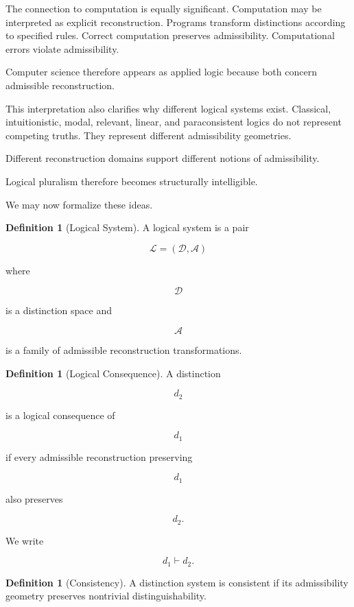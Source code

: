 \documentclass[12pt,oneside]{article}
\theoremstyle{definition}
\newtheorem{definition}[theorem]{Definition} \newtheorem{axiom}[theorem]{Axiom} \newtheorem{remark}[theorem]{Remark} \newtheorem{example}[theorem]{Example}
\begin{document}
The connection to computation is equally significant. Computation may be interpreted as explicit reconstruction. Programs transform distinctions according to specified rules. Correct computation preserves admissibility. Computational errors violate admissibility.

Computer science therefore appears as applied logic because both concern admissible reconstruction.

This interpretation also clarifies why different logical systems exist. Classical, intuitionistic, modal, relevant, linear, and paraconsistent logics do not represent competing truths. They represent different admissibility geometries.

Different reconstruction domains support different notions of admissibility.

Logical pluralism therefore becomes structurally intelligible.

We may now formalize these ideas.

\begin{definition}[Logical System]

A logical system is a pair

\[
\mathcal L
=
(\mathcal D,\mathcal A)
\]

where

\[
\mathcal D
\]

is a distinction space and

\[
\mathcal A
\]

is a family of admissible reconstruction transformations.

\end{definition}

\begin{definition}[Logical Consequence]

A distinction

\[
d_2
\]

is a logical consequence of

\[
d_1
\]

if every admissible reconstruction preserving

\[
d_1
\]

also preserves

\[
d_2.
\]

We write

\[
d_1 \vdash d_2.
\]

\end{definition}

\begin{definition}[Consistency]

A distinction system is consistent if its admissibility geometry preserves nontrivial distinguishability.

\end{definition}
\end{document}
